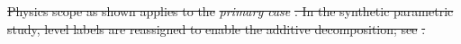\documentclass[a4paper,fleqn]{cas-sc} %
\renewcommand{\checkmark}{\ding{51}} %
\providecommand{\DIFdel}[1]{{\protect\color{red}\sout{#1}}} %
\providecommand{\DIFdelFL}[1]{\DIFdel{#1}} %
\providecommand{\Cref}[1]{\ref{#1}}
\begin{document}
{\begin{table}[t]
\DIFdelFL{Physics scope as shown applies to the
    }\emph{\DIFdelFL{primary case}}%
\DIFdelFL{. In the synthetic parametric study, level labels are reassigned to enable the additive
    decomposition; see }%
\DIFdelFL{.
}%

\end{table}}
\end{document}
